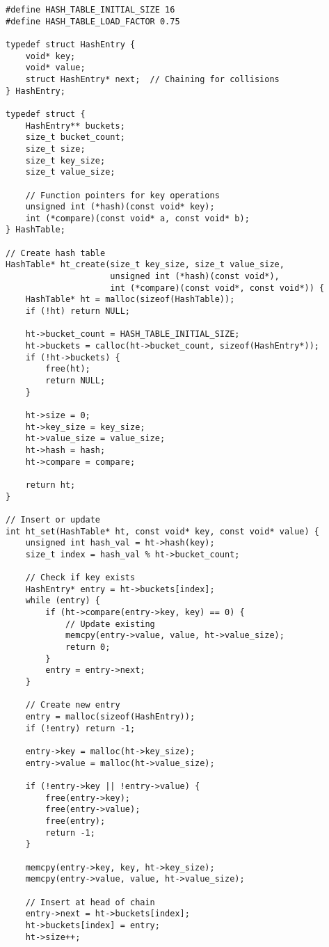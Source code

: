\begin{lstlisting}
#define HASH_TABLE_INITIAL_SIZE 16
#define HASH_TABLE_LOAD_FACTOR 0.75

typedef struct HashEntry {
    void* key;
    void* value;
    struct HashEntry* next;  // Chaining for collisions
} HashEntry;

typedef struct {
    HashEntry** buckets;
    size_t bucket_count;
    size_t size;
    size_t key_size;
    size_t value_size;

    // Function pointers for key operations
    unsigned int (*hash)(const void* key);
    int (*compare)(const void* a, const void* b);
} HashTable;

// Create hash table
HashTable* ht_create(size_t key_size, size_t value_size,
                     unsigned int (*hash)(const void*),
                     int (*compare)(const void*, const void*)) {
    HashTable* ht = malloc(sizeof(HashTable));
    if (!ht) return NULL;

    ht->bucket_count = HASH_TABLE_INITIAL_SIZE;
    ht->buckets = calloc(ht->bucket_count, sizeof(HashEntry*));
    if (!ht->buckets) {
        free(ht);
        return NULL;
    }

    ht->size = 0;
    ht->key_size = key_size;
    ht->value_size = value_size;
    ht->hash = hash;
    ht->compare = compare;

    return ht;
}

// Insert or update
int ht_set(HashTable* ht, const void* key, const void* value) {
    unsigned int hash_val = ht->hash(key);
    size_t index = hash_val % ht->bucket_count;

    // Check if key exists
    HashEntry* entry = ht->buckets[index];
    while (entry) {
        if (ht->compare(entry->key, key) == 0) {
            // Update existing
            memcpy(entry->value, value, ht->value_size);
            return 0;
        }
        entry = entry->next;
    }

    // Create new entry
    entry = malloc(sizeof(HashEntry));
    if (!entry) return -1;

    entry->key = malloc(ht->key_size);
    entry->value = malloc(ht->value_size);

    if (!entry->key || !entry->value) {
        free(entry->key);
        free(entry->value);
        free(entry);
        return -1;
    }

    memcpy(entry->key, key, ht->key_size);
    memcpy(entry->value, value, ht->value_size);

    // Insert at head of chain
    entry->next = ht->buckets[index];
    ht->buckets[index] = entry;
    ht->size++;


\end{lstlisting}
